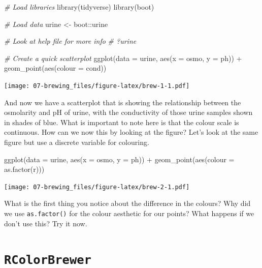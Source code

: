 \documentclass[
]{book}
\newenvironment{Shaded}{\begin{snugshade}}{\end{snugshade}}
\newcommand{\AttributeTok}[1]{\textcolor[rgb]{0.77,0.63,0.00}{#1}}
\newcommand{\CommentTok}[1]{\textcolor[rgb]{0.56,0.35,0.01}{\textit{#1}}}
\newcommand{\FunctionTok}[1]{\textcolor[rgb]{0.00,0.00,0.00}{#1}}
\newcommand{\NormalTok}[1]{#1}
\newcommand{\OtherTok}[1]{\textcolor[rgb]{0.56,0.35,0.01}{#1}}
\newcommand{\SpecialCharTok}[1]{\textcolor[rgb]{0.00,0.00,0.00}{#1}}
\begin{document}
\begin{Shaded}
\begin{Highlighting}[]
\CommentTok{\# Load libraries}
\FunctionTok{library}\NormalTok{(tidyverse)}
\FunctionTok{library}\NormalTok{(boot)}

\CommentTok{\# Load data}
\NormalTok{urine }\OtherTok{\textless{}{-}}\NormalTok{ boot}\SpecialCharTok{::}\NormalTok{urine}

\CommentTok{\# Look at help file for more info}
\CommentTok{\# ?urine}

\CommentTok{\# Create a quick scatterplot}
\FunctionTok{ggplot}\NormalTok{(}\AttributeTok{data =}\NormalTok{ urine, }\FunctionTok{aes}\NormalTok{(}\AttributeTok{x =}\NormalTok{ osmo, }\AttributeTok{y =}\NormalTok{ ph)) }\SpecialCharTok{+}
  \FunctionTok{geom\_point}\NormalTok{(}\FunctionTok{aes}\NormalTok{(}\AttributeTok{colour =}\NormalTok{ cond))}
\end{Highlighting}
\end{Shaded}

\texttt{[image: 07-brewing\_files/figure-latex/brew-1-1.pdf]}

And now we have a scatterplot that is showing the relationship between the osmolarity and pH of urine, with the conductivity of those urine samples shown in shades of blue. What is important to note here is that the colour scale is continuous. How can we now this by looking at the figure? Let's look at the same figure but use a discrete variable for colouring.

\begin{Shaded}
\begin{Highlighting}[]
\FunctionTok{ggplot}\NormalTok{(}\AttributeTok{data =}\NormalTok{ urine, }\FunctionTok{aes}\NormalTok{(}\AttributeTok{x =}\NormalTok{ osmo, }\AttributeTok{y =}\NormalTok{ ph)) }\SpecialCharTok{+}
  \FunctionTok{geom\_point}\NormalTok{(}\FunctionTok{aes}\NormalTok{(}\AttributeTok{colour =} \FunctionTok{as.factor}\NormalTok{(r)))}
\end{Highlighting}
\end{Shaded}

\texttt{[image: 07-brewing\_files/figure-latex/brew-2-1.pdf]}

What is the first thing you notice about the difference in the colours? Why did we use \texttt{as.factor()} for the colour aesthetic for our points? What happens if we don't use this? Try it now.

\hypertarget{rcolorbrewer}{%
\section{\texorpdfstring{\textbf{\texttt{RColorBrewer}}}{RColorBrewer}}\label{rcolorbrewer}}
\end{document}
